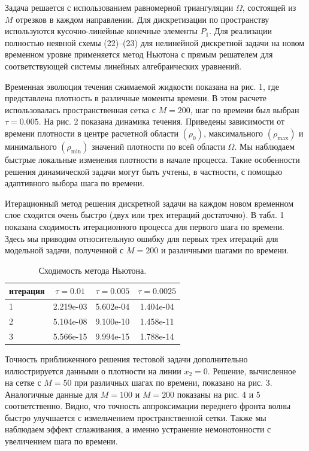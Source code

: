 \documentclass[10pt,twocolumn]{article}
\begin{document}
Задача решается с использованием равномерной триангуляции \(\Omega\), состоящей из \(M\) отрезков в каждом направлении. Для дискретизации по пространству используются кусочно-линейные конечные элементы \(P_{1}\). Для реализации полностью неявной схемы (22)–(23) для нелинейной дискретной задачи на новом временном уровне применяется метод Ньютона с прямым решателем для соответствующей системы линейных алгебраических уравнений.

Временная эволюция течения сжимаемой жидкости показана на рис. 1, где представлена плотность в различные моменты времени. В этом расчете использовалась пространственная сетка с \(M = 200\), шаг по времени был выбран \(\tau = 0.005\). На рис. 2 показана динамика течения. Приведены зависимости от времени плотности в центре расчетной области \((\rho_0)\), максимального \((\rho_{\mathrm{max}})\) и минимального \((\rho_{\mathrm{min}})\) значений плотности по всей области \(\Omega\). Мы наблюдаем быстрые локальные изменения плотности в начале процесса. Такие особенности решения динамической задачи могут быть учтены, в частности, с помощью адаптивного выбора шага по времени.

Итерационный метод решения дискретной задачи на каждом новом временном слое сходится очень быстро (двух или трех итераций достаточно). В табл. 1 показана сходимость итерационного процесса для первого шага по времени. Здесь мы приводим относительную ошибку для первых трех итераций для модельной задачи, полученной с \(M = 200\) и различными шагами по времени.

\begin{table}[h]
\centering
\caption{Сходимость метода Ньютона.}
\label{tab:convergence}
\begin{tabular}{lccc}
\hline
итерация & \(\tau = 0.01\) & \(\tau = 0.005\) & \(\tau = 0.0025\) \\
\hline
1 & 2.219e-03 & 5.602e-04 & 1.404e-04 \\
2 & 5.104e-08 & 9.100e-10 & 1.458e-11 \\
3 & 5.566e-15 & 9.994e-15 & 1.788e-14 \\
\hline
\end{tabular}
\end{table}

Точность приближенного решения тестовой задачи дополнительно иллюстрируется данными о плотности на линии \(x_{2} = 0\). Решение, вычисленное на сетке с \(M = 50\) при различных шагах по времени, показано на рис. 3. Аналогичные данные для \(M = 100\) и \(M = 200\) показаны на рис. 4 и 5 соответственно. Видно, что точность аппроксимации переднего фронта волны быстро улучшается с измельчением пространственной сетки. Также мы наблюдаем эффект сглаживания, а именно устранение немонотонности с увеличением шага по времени.
\end{document}
